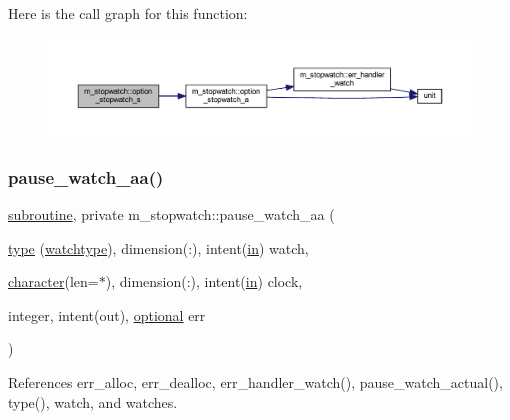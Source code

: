 Here is the call graph for this function\+:
\nopagebreak
\begin{figure}[H]
\begin{center}
\leavevmode
\includegraphics[width=350pt]{namespacem__stopwatch_a9667f04e61746b7d2b74e9de0d707af0_cgraph}
\end{center}
\end{figure}
\mbox{\label{namespacem__stopwatch_a7ebcc1a6c6636aa2ff91b549b68dfcca}} 
\subsubsection{\texorpdfstring{pause\+\_\+watch\+\_\+aa()}{pause\_watch\_aa()}}
{\footnotesize\ttfamily \hyperlink{M__stopwatch_83_8txt_acfbcff50169d691ff02d4a123ed70482}{subroutine}, private m\+\_\+stopwatch\+::pause\+\_\+watch\+\_\+aa (\begin{DoxyParamCaption}\item[{\hyperlink{stop__watch_83_8txt_a70f0ead91c32e25323c03265aa302c1c}{type} (\hyperlink{structm__stopwatch_1_1watchtype}{watchtype}), dimension(\+:), intent(\hyperlink{M__journal_83_8txt_afce72651d1eed785a2132bee863b2f38}{in})}]{watch,  }\item[{\hyperlink{option__stopwatch_83_8txt_abd4b21fbbd175834027b5224bfe97e66}{character}(len=$\ast$), dimension(\+:), intent(\hyperlink{M__journal_83_8txt_afce72651d1eed785a2132bee863b2f38}{in})}]{clock,  }\item[{integer, intent(out), \hyperlink{option__stopwatch_83_8txt_aa4ece75e7acf58a4843f70fe18c3ade5}{optional}}]{err }\end{DoxyParamCaption})\hspace{0.3cm}{\ttfamily [private]}}



References err\+\_\+alloc, err\+\_\+dealloc, err\+\_\+handler\+\_\+watch(), pause\+\_\+watch\+\_\+actual(), type(), watch, and watches.

